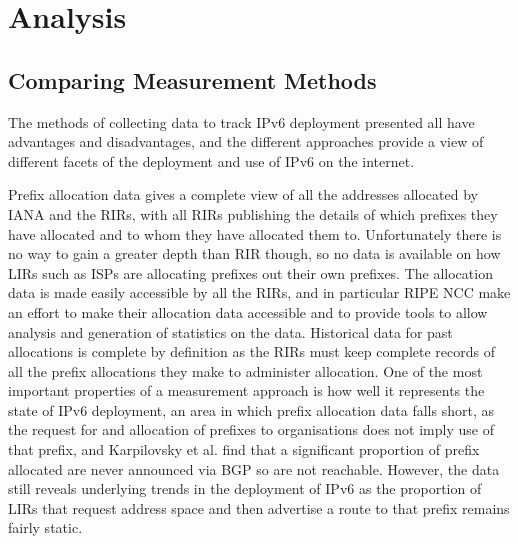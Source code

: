 \section{Analysis}

\subsection{Comparing Measurement Methods}

The methods of collecting data to track IPv6 deployment presented all have
advantages and disadvantages, and the different approaches provide a view of
different facets of the deployment and use of IPv6 on the internet. 

Prefix allocation data gives a complete view of all the addresses allocated by
IANA and the RIRs, with all RIRs publishing the details of which prefixes they
have allocated and to whom they have allocated them to. Unfortunately there is
no way to gain a greater depth than RIR though, so no data is available on how
LIRs such as ISPs are allocating prefixes out their own prefixes. The allocation
data is made easily accessible by all the RIRs, and in particular RIPE NCC make
an effort to make their allocation data accessible and to provide tools to allow
analysis and generation of statistics on the data\cite{ripe_ncc_ripestat_2011}. Historical data for
past allocations is complete by definition as the RIRs must keep complete
records of all the prefix allocations they make to administer allocation. One of
the most important properties of a measurement approach is how well it
represents the state of IPv6 deployment, an area in which prefix allocation data
falls short, as the request for and allocation of prefixes to organisations does
not imply use of that prefix, and Karpilovsky et al. find that a significant
proportion of prefix allocated are never announced via BGP so are not
reachable\cite{karpilovsky_quantifying_2009}.
However, the data still reveals underlying trends in the deployment of IPv6 as
the proportion of LIRs that request address space and then advertise a route to
that prefix remains fairly static.

